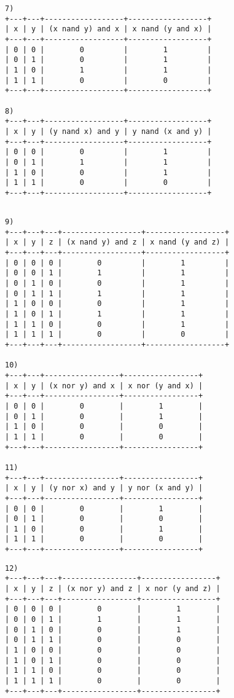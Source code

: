 \documentclass{article}
\begin{document}
\begin{verbatim}
7)
+---+---+------------------+------------------+
| x | y | (x nand y) and x | x nand (y and x) |
+---+---+------------------+------------------+
| 0 | 0 |        0         |        1         |
| 0 | 1 |        0         |        1         |
| 1 | 0 |        1         |        1         |
| 1 | 1 |        0         |        0         |
+---+---+------------------+------------------+

8)
+---+---+------------------+------------------+
| x | y | (y nand x) and y | y nand (x and y) |
+---+---+------------------+------------------+
| 0 | 0 |        0         |        1         |
| 0 | 1 |        1         |        1         |
| 1 | 0 |        0         |        1         |
| 1 | 1 |        0         |        0         |
+---+---+------------------+------------------+

\end{verbatim}

\newpage

\begin{verbatim}

9)
+---+---+---+------------------+------------------+
| x | y | z | (x nand y) and z | x nand (y and z) |
+---+---+---+------------------+------------------+
| 0 | 0 | 0 |        0         |        1         |
| 0 | 0 | 1 |        1         |        1         |
| 0 | 1 | 0 |        0         |        1         |
| 0 | 1 | 1 |        1         |        1         |
| 1 | 0 | 0 |        0         |        1         |
| 1 | 0 | 1 |        1         |        1         |
| 1 | 1 | 0 |        0         |        1         |
| 1 | 1 | 1 |        0         |        0         |
+---+---+---+------------------+------------------+

10)
+---+---+-----------------+-----------------+
| x | y | (x nor y) and x | x nor (y and x) |
+---+---+-----------------+-----------------+
| 0 | 0 |        0        |        1        |
| 0 | 1 |        0        |        1        |
| 1 | 0 |        0        |        0        |
| 1 | 1 |        0        |        0        |
+---+---+-----------------+-----------------+

11)
+---+---+-----------------+-----------------+
| x | y | (y nor x) and y | y nor (x and y) |
+---+---+-----------------+-----------------+
| 0 | 0 |        0        |        1        |
| 0 | 1 |        0        |        0        |
| 1 | 0 |        0        |        1        |
| 1 | 1 |        0        |        0        |
+---+---+-----------------+-----------------+
\end{verbatim}
\newpage
\begin{verbatim}
12)
+---+---+---+-----------------+-----------------+
| x | y | z | (x nor y) and z | x nor (y and z) |
+---+---+---+-----------------+-----------------+
| 0 | 0 | 0 |        0        |        1        |
| 0 | 0 | 1 |        1        |        1        |
| 0 | 1 | 0 |        0        |        1        |
| 0 | 1 | 1 |        0        |        0        |
| 1 | 0 | 0 |        0        |        0        |
| 1 | 0 | 1 |        0        |        0        |
| 1 | 1 | 0 |        0        |        0        |
| 1 | 1 | 1 |        0        |        0        |
+---+---+---+-----------------+-----------------+

\end{verbatim}
\end{document}
